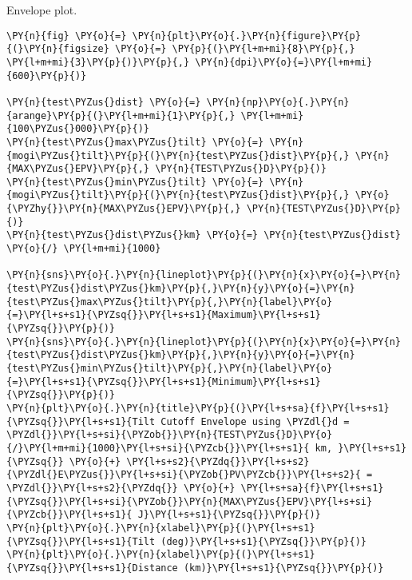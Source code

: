 Envelope plot.

\begin{tcolorbox}[breakable, size=fbox, boxrule=1pt, pad at break*=1mm,colback=cellbackground, colframe=cellborder]
\begin{Verbatim}[commandchars=\\\{\}]
\PY{n}{fig} \PY{o}{=} \PY{n}{plt}\PY{o}{.}\PY{n}{figure}\PY{p}{(}\PY{n}{figsize} \PY{o}{=} \PY{p}{(}\PY{l+m+mi}{8}\PY{p}{,} \PY{l+m+mi}{3}\PY{p}{)}\PY{p}{,} \PY{n}{dpi}\PY{o}{=}\PY{l+m+mi}{600}\PY{p}{)}

\PY{n}{test\PYZus{}dist} \PY{o}{=} \PY{n}{np}\PY{o}{.}\PY{n}{arange}\PY{p}{(}\PY{l+m+mi}{1}\PY{p}{,} \PY{l+m+mi}{100\PYZus{}000}\PY{p}{)}
\PY{n}{test\PYZus{}max\PYZus{}tilt} \PY{o}{=} \PY{n}{mogi\PYZus{}tilt}\PY{p}{(}\PY{n}{test\PYZus{}dist}\PY{p}{,} \PY{n}{MAX\PYZus{}EPV}\PY{p}{,} \PY{n}{TEST\PYZus{}D}\PY{p}{)}
\PY{n}{test\PYZus{}min\PYZus{}tilt} \PY{o}{=} \PY{n}{mogi\PYZus{}tilt}\PY{p}{(}\PY{n}{test\PYZus{}dist}\PY{p}{,} \PY{o}{\PYZhy{}}\PY{n}{MAX\PYZus{}EPV}\PY{p}{,} \PY{n}{TEST\PYZus{}D}\PY{p}{)}
\PY{n}{test\PYZus{}dist\PYZus{}km} \PY{o}{=} \PY{n}{test\PYZus{}dist} \PY{o}{/} \PY{l+m+mi}{1000}

\PY{n}{sns}\PY{o}{.}\PY{n}{lineplot}\PY{p}{(}\PY{n}{x}\PY{o}{=}\PY{n}{test\PYZus{}dist\PYZus{}km}\PY{p}{,}\PY{n}{y}\PY{o}{=}\PY{n}{test\PYZus{}max\PYZus{}tilt}\PY{p}{,}\PY{n}{label}\PY{o}{=}\PY{l+s+s1}{\PYZsq{}}\PY{l+s+s1}{Maximum}\PY{l+s+s1}{\PYZsq{}}\PY{p}{)}
\PY{n}{sns}\PY{o}{.}\PY{n}{lineplot}\PY{p}{(}\PY{n}{x}\PY{o}{=}\PY{n}{test\PYZus{}dist\PYZus{}km}\PY{p}{,}\PY{n}{y}\PY{o}{=}\PY{n}{test\PYZus{}min\PYZus{}tilt}\PY{p}{,}\PY{n}{label}\PY{o}{=}\PY{l+s+s1}{\PYZsq{}}\PY{l+s+s1}{Minimum}\PY{l+s+s1}{\PYZsq{}}\PY{p}{)}
\PY{n}{plt}\PY{o}{.}\PY{n}{title}\PY{p}{(}\PY{l+s+sa}{f}\PY{l+s+s1}{\PYZsq{}}\PY{l+s+s1}{Tilt Cutoff Envelope using \PYZdl{}d = \PYZdl{}}\PY{l+s+si}{\PYZob{}}\PY{n}{TEST\PYZus{}D}\PY{o}{/}\PY{l+m+mi}{1000}\PY{l+s+si}{\PYZcb{}}\PY{l+s+s1}{ km, }\PY{l+s+s1}{\PYZsq{}} \PY{o}{+} \PY{l+s+s2}{\PYZdq{}}\PY{l+s+s2}{\PYZdl{}E\PYZus{}}\PY{l+s+si}{\PYZob{}PV\PYZcb{}}\PY{l+s+s2}{ = \PYZdl{}}\PY{l+s+s2}{\PYZdq{}} \PY{o}{+} \PY{l+s+sa}{f}\PY{l+s+s1}{\PYZsq{}}\PY{l+s+si}{\PYZob{}}\PY{n}{MAX\PYZus{}EPV}\PY{l+s+si}{\PYZcb{}}\PY{l+s+s1}{ J}\PY{l+s+s1}{\PYZsq{}}\PY{p}{)}
\PY{n}{plt}\PY{o}{.}\PY{n}{xlabel}\PY{p}{(}\PY{l+s+s1}{\PYZsq{}}\PY{l+s+s1}{Tilt (deg)}\PY{l+s+s1}{\PYZsq{}}\PY{p}{)}
\PY{n}{plt}\PY{o}{.}\PY{n}{xlabel}\PY{p}{(}\PY{l+s+s1}{\PYZsq{}}\PY{l+s+s1}{Distance (km)}\PY{l+s+s1}{\PYZsq{}}\PY{p}{)}


\end{Verbatim}
\end{tcolorbox}
